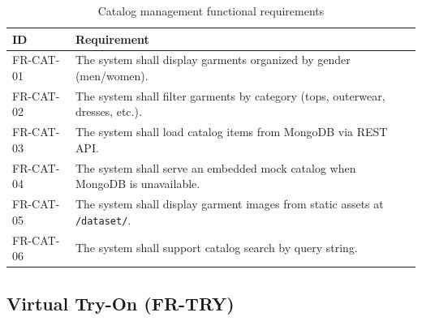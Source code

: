 \begin{table}[H]
  \centering
  \caption{Catalog management functional requirements}
  \label{tab:fr-catalog}
  \small
  \begin{tabular}{@{}p{1.5cm}p{12cm}@{}}
    \toprule
    \textbf{ID} & \textbf{Requirement} \\
    \midrule
    FR-CAT-01 & The system shall display garments organized by gender (men/women). \\
    FR-CAT-02 & The system shall filter garments by category (tops, outerwear, dresses, etc.). \\
    FR-CAT-03 & The system shall load catalog items from MongoDB via REST API. \\
    FR-CAT-04 & The system shall serve an embedded mock catalog when MongoDB is unavailable. \\
    FR-CAT-05 & The system shall display garment images from static assets at \texttt{/dataset/}. \\
    FR-CAT-06 & The system shall support catalog search by query string. \\
    \bottomrule
  \end{tabular}
\end{table}

\subsection{Virtual Try-On (FR-TRY)}

